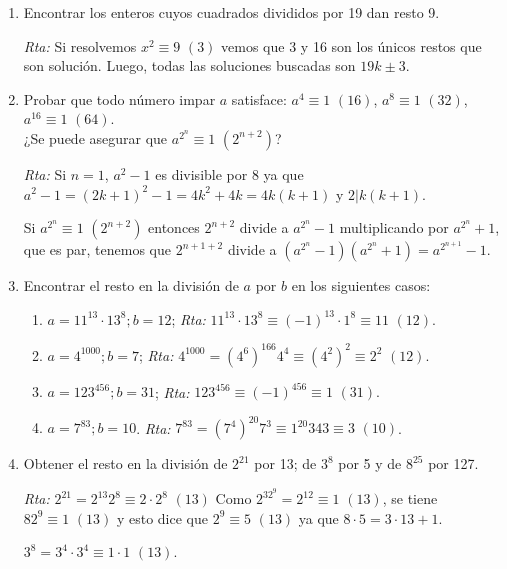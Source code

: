 \documentclass[12pt,spanish,makeidx]{amsbook}
\newcommand{\rta}{\noindent\textit{Rta: }}
\newcommand{\espm}{{\,\,}}
\begin{document}
\begin{enumerate}
	\smallskip
	\item Encontrar los enteros cuyos cuadrados divididos por 19 dan resto 9.
		
	\rta Si resolvemos $x^2\equiv 9 \espm(3) $ vemos que 3 y 16 son los únicos restos que son solución. Luego, todas las soluciones buscadas son $19k\pm3$. 
	
	
	\smallskip
	
	\item Probar que todo número impar $a$ satisface: $a^4 \equiv 1\espm(16)$, $a^8 \equiv 1\espm(32)$, $a^{16}\equiv 1\espm(64)$.\\ ¿Se puede asegurar que $a^{2^n} \equiv 1 \espm(2^{n+2})$?
		
	\rta Si $n=1$,  $a^2-1$ es divisible por 8 ya que $a^2-1 =(2k+1)^2-1=4k^2+4k=4k(k+1)$ y $2\vert k(k+1)$.
	
	Si $a^{2^n}\equiv 1 \espm(2^{n+2})$ entonces $2^{n+2}$ divide a $a^{2^n}-1$ multiplicando por $a^{2^n}+ 1$, que es par, tenemos que $2^{n+1+2}$ divide a $(a^{2^n}-1)(a^{2^n}+1)=a^{2^{n+1}}-1$.
	
	
	\smallskip
	
\item Encontrar el resto en la división de $a$ por $b$ en los siguientes casos:
\begin{enumerate}
	\item $a = 11^{13}\cdot13^8 ; b = 12$;  \rta  $11^{13}\cdot13^8\equiv (-1)^{13}\cdot 1^8\equiv 11 \espm(12)$.
	
	\item $a = 4^{1000}; b = 7$;  \rta  $4^{1000}=(4^6)^{166}4^4\equiv (4^2)^2\equiv 2^2 \espm(12)$.
	
	\item $a = 123^{456}; b = 31$;  \rta  $123^{456}\equiv (-1)^{456}\equiv 1 \espm(31).$
	
	\item $a = 7^{83}; b = 10$.  \rta  $7^{83}= (7^4)^{20}7^3\equiv 1^{20}343\equiv 3 \espm(10)$.
\end{enumerate}
	
	\item Obtener el resto en la división de $2^{21}$ por 13; de $3^8$ por 5 y de
	$8^{25}$ por 127.
		
	\rta  $2^{21}=2^{13}2^8\equiv 2\cdot2^8 \espm(13)$ Como $2^32^9= 2^{12}\equiv 1 \espm(13)$, se tiene $82^9\equiv1 \espm(13)$ y esto dice que $2^9\equiv 5 \espm(13)$ ya que $8\cdot 5=3\cdot 13 +1$.
	
	$3^8=3^4\cdot 3^4\equiv 1\cdot1 \espm(13)$.
	

\end{enumerate}
\end{document}
